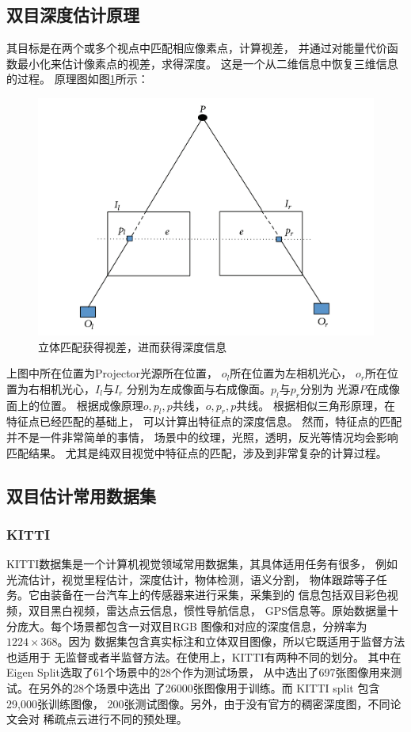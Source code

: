 \subsection{双目深度估计原理}
其目标是在两个或多个视点中匹配相应像素点，计算视差，
并通过对能量代价函数最小化来估计像素点的视差，求得深度。
这是一个从二维信息中恢复三维信息的过程。
原理图如图\ref{stereo matching}所示：
\begin{figure}[ht]
 \centering
\includegraphics[width=0.5\linewidth]{figure/stereo_theory.pdf}
\caption{立体匹配获得视差，进而获得深度信息}
\label{stereo matching}
\end{figure}
上图中所在位置为Projector光源所在位置，
$o_l$所在位置为左相机光心，
$o_r$所在位置为右相机光心，$I_l$与$I_r$
分别为左成像面与右成像面。$p_l$与$p_r$分别为
光源\emph{P}在成像面上的位置。
根据成像原理$o,p_l,p$共线，$o,p_r,p$共线。
根据相似三角形原理，在特征点已经匹配的基础上，
可以计算出特征点的深度信息。
然而，特征点的匹配并不是一件非常简单的事情，
场景中的纹理，光照，透明，反光等情况均会影响匹配结果。
尤其是纯双目视觉中特征点的匹配，涉及到非常复杂的计算过程。

\subsection{双目估计常用数据集}
\subsubsection{KITTI}
\label{kitti}
KITTI数据集是一个计算机视觉领域常用数据集，其具体适用任务有很多，
例如光流估计，视觉里程估计，深度估计，物体检测，语义分割，
物体跟踪等子任务。它由装备在一台汽车上的传感器来进行采集，采集到的
信息包括双目彩色视频，双目黑白视频，雷达点云信息，惯性导航信息，
GPS信息等。原始数据量十分庞大。每个场景都包含一对双目RGB
图像和对应的深度信息，分辨率为$1224 \times 368$。因为
数据集包含真实标注和立体双目图像，所以它既适用于监督方法也适用于
无监督或者半监督方法。在使用上，KITTI有两种不同的划分。
其中在Eigen Split选取了61个场景中的28个作为测试场景，
从中选出了697张图像用来测试。在另外的28个场景中选出
了26000张图像用于训练。而 KITTI split 包含29,000张训练图像，
200张测试图像。另外，由于没有官方的稠密深度图，不同论文会对
稀疏点云进行不同的预处理。
